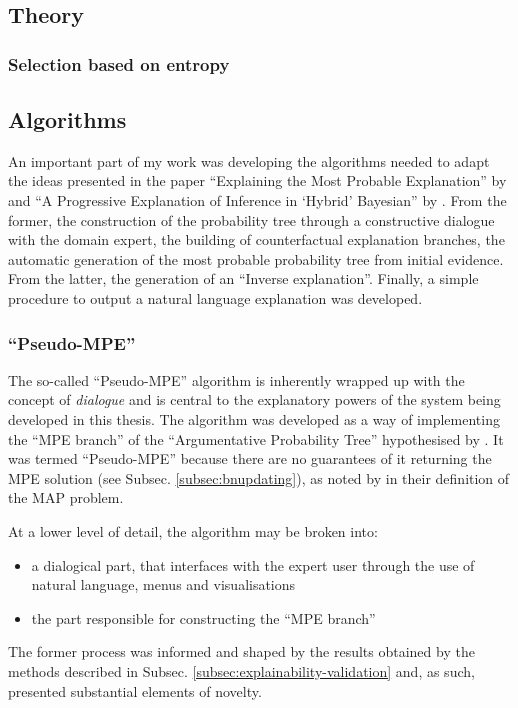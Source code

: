\subsection{Theory} \label{subsec:theory}

\subsubsection{Selection based on entropy}

\subsection{Algorithms}
An important part of my work was developing the algorithms needed to adapt the ideas presented in the paper \enquote{Explaining the Most Probable Explanation} by \cite{Butz2018} and \enquote{A Progressive Explanation of Inference in \enquote{Hybrid} Bayesian} by \cite{Kyrimi2016}.
From the former, the construction of the probability tree through a constructive dialogue with the domain expert, the building of counterfactual explanation branches, the automatic generation of the most probable probability tree from initial evidence.
From the latter, the generation of an \enquote{Inverse explanation}.
Finally, a simple procedure to output a natural language explanation was developed.

\subsubsection{\enquote{Pseudo-MPE}} \label{subsubsec:pseudo-mpe}
The so-called \enquote{Pseudo-MPE} algorithm is inherently wrapped up with the concept of \textit{dialogue} and is central to the explanatory powers of the system being developed in this thesis.
The algorithm was developed as a way of implementing the \enquote{MPE branch} of the \enquote{Argumentative Probability Tree} hypothesised by \cite{Butz2018}.
It was termed \enquote{Pseudo-MPE} because there are no guarantees of it returning the MPE solution (see Subsec. \ref{subsec:bnupdating}), as noted by \cite{koller2007introduction} in their definition of the MAP problem.

At a lower level of detail, the algorithm may be broken into:
\begin{itemize}
	\item a dialogical part, that interfaces with the expert user through the use of natural language, menus and visualisations
	\item the part responsible for constructing the \enquote{MPE branch}
\end{itemize}
The former process was informed and shaped by the results obtained by the methods described in Subsec. \ref{subsec:explainability-validation} and, as such, presented substantial elements of novelty.

